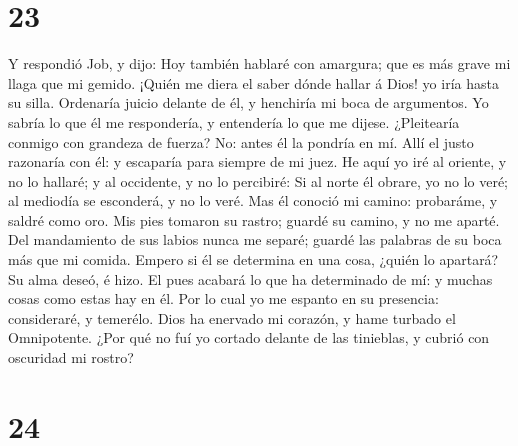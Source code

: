 \hypertarget{section-22}{%
\section{23}\label{section-22}}

 Y respondió Job, y dijo:  Hoy también
hablaré con amargura; que es más grave mi llaga que mi gemido.
 ¡Quién me diera el saber dónde hallar á Dios! yo iría
hasta su silla.  Ordenaría juicio delante de él, y
henchiría mi boca de argumentos.  Yo sabría lo que él me
respondería, y entendería lo que me dijese.  ¿Pleitearía
conmigo con grandeza de fuerza? No: antes él la pondría en mí.
 Allí el justo razonaría con él: y escaparía para siempre
de mi juez.  He aquí yo iré al oriente, y no lo hallaré; y
al occidente, y no lo percibiré:  Si al norte él obrare,
yo no lo veré; al mediodía se esconderá, y no lo veré. 
Mas él conoció mi camino: probaráme, y saldré como oro. 
Mis pies tomaron su rastro; guardé su camino, y no me aparté.
 Del mandamiento de sus labios nunca me separé; guardé
las palabras de su boca más que mi comida.  Empero si él
se determina en una cosa, ¿quién lo apartará? Su alma deseó, é hizo.
 El pues acabará lo que ha determinado de mí: y muchas
cosas como estas hay en él.  Por lo cual yo me espanto en
su presencia: consideraré, y temerélo.  Dios ha enervado
mi corazón, y hame turbado el Omnipotente.  ¿Por qué no
fuí yo cortado delante de las tinieblas, y cubrió con oscuridad mi
rostro?

\hypertarget{section-23}{%
\section{24}\label{section-23}}

